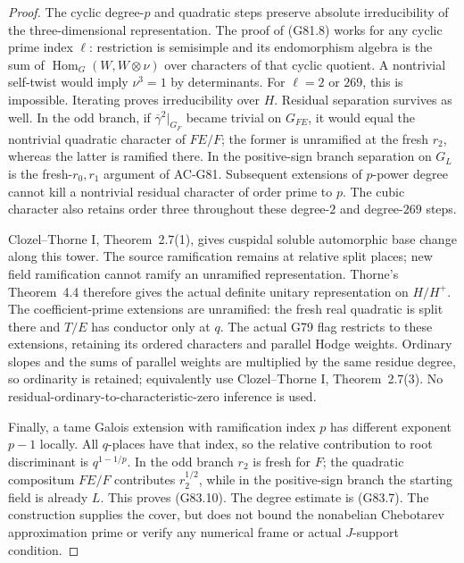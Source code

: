 \begin{proof}
The cyclic degree-\(p\) and quadratic steps preserve
absolute irreducibility of the three-dimensional
representation.  The proof of (G81.8) works for any
cyclic prime index \(\ell\): restriction is semisimple
and its endomorphism algebra is the sum of
\(\operatorname{Hom}_G(W,W\otimes\nu)\) over characters
of that cyclic quotient.  A nontrivial self-twist
would imply \(\nu^3=1\) by determinants.
For \(\ell=2\) or \(269\), this is impossible.
Iterating proves irreducibility over \(H\).
Residual separation survives as well.  In the odd branch,
if \(\overline\gamma^2|_{G_F}\) became trivial on \(G_{FE}\),
it would equal the nontrivial quadratic character of
\(FE/F\); the former is unramified at the fresh \(r_2\),
whereas the latter is ramified there.
In the positive-sign branch separation on \(G_L\) is the
fresh-\(r_0,r_1\) argument of AC-G81.
Subsequent extensions of \(p\)-power degree cannot kill a
nontrivial residual character of order prime to \(p\).
The cubic character also retains order three throughout
these degree-\(2\) and degree-\(269\) steps.

Clozel--Thorne I, Theorem~2.7(1), gives cuspidal soluble
automorphic base change along this tower.
The source ramification remains at relative split
places; new field ramification cannot ramify an
unramified representation.
Thorne's Theorem~4.4 therefore gives the actual definite
unitary representation on \(H/H^+\).
The coefficient-prime extensions are unramified:
the fresh real quadratic is split there and \(T/E\)
has conductor only at \(q\).
The actual G79 flag restricts to these extensions,
retaining its ordered characters and parallel Hodge
weights.  Ordinary slopes and the sums of parallel
weights are multiplied by the same residue degree,
so ordinarity is retained; equivalently use
Clozel--Thorne I, Theorem~2.7(3).
No residual-ordinary-to-characteristic-zero inference
is used.

Finally, a tame Galois extension with ramification
index \(p\) has different exponent \(p-1\) locally.
All \(q\)-places have that index, so the relative
contribution to root discriminant is
\(q^{1-1/p}\).
In the odd branch \(r_2\) is fresh for \(F\);
the quadratic compositum \(FE/F\) contributes
\(r_2^{1/2}\), while in the positive-sign branch
the starting field is already \(L\).
This proves (G83.10).
The degree estimate is (G83.7).
The construction supplies the cover, but does not
bound the nonabelian Chebotarev approximation prime
or verify any numerical frame or actual \(J\)-support
condition.
\end{proof}
